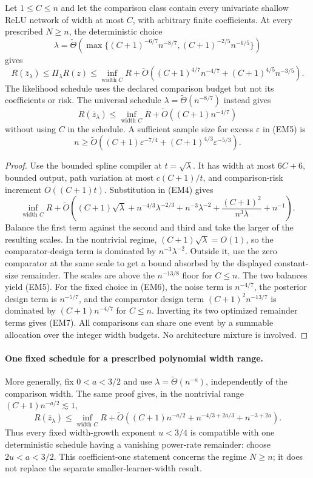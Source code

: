 \begin{corollary}
\label{cor:wide-sharp-width}
Let $1\le C\le n$ and let the comparison class contain every
univariate shallow ReLU network of width at most $C$, with arbitrary
finite coefficients. At every prescribed
$N\ge n$, the deterministic choice
\[
 \lambda=\widetilde\Theta\left(
 \max\{(C+1)^{-6/7}n^{-8/7},
       (C+1)^{-2/5}n^{-6/5}\}\right)
\]
gives
\[
 R(\bar z_\lambda)\le\Pi_\lambda R(z)
 \le\inf_{\text{width }C}R+
 \widetilde O\left(
 (C+1)^{4/7}n^{-4/7}
 +(C+1)^{4/5}n^{-3/5}\right). \tag{EM5}
\]
The likelihood schedule uses the declared comparison budget but not
its coefficients or risk. The universal schedule
$\lambda=\widetilde\Theta(n^{-8/7})$ instead gives
\[
 R(\bar z_\lambda)\le\inf_{\text{width }C}R+
       \widetilde O((C+1)n^{-4/7}) \tag{EM6}
\]
without using $C$ in the schedule.
A sufficient sample size for excess $\varepsilon$ in (EM5) is
\[
 n\ge\widetilde O\left(
 (C+1)\varepsilon^{-7/4}
 +(C+1)^{4/3}\varepsilon^{-5/3}\right). \tag{EM7}
\]
\end{corollary}
\begin{proof}
Use the bounded spline compiler at $t=\sqrt\lambda$.
It has width at most $6C+6$, bounded output, path variation
at most $c(C+1)/t$, and comparison-risk increment
$O((C+1)t)$. Substitution in (EM4) gives
\[
 \inf_{\text{width }C}R+\widetilde O\left(
 (C+1)\sqrt\lambda+n^{-4/3}\lambda^{-2/3}
 +n^{-3}\lambda^{-2}
 +\frac{(C+1)^2}{n^3\lambda}+n^{-1}\right).
\]
Balance the first term against the second and third and take
the larger of the resulting scales. In the nontrivial regime,
$(C+1)\sqrt\lambda=O(1)$, so the comparator-design term is dominated
by $n^{-3}\lambda^{-2}$. Outside it, use the zero comparator at
the same scale to get a bound absorbed by the displayed constant-size
remainder. The scales are above the $n^{-13/8}$ floor for $C\le n$.
The two balances yield (EM5). For the fixed choice in (EM6),
the noise term is $n^{-4/7}$, the posterior design term is
$n^{-5/7}$, and the comparator design term
$(C+1)^2n^{-13/7}$ is dominated by $(C+1)n^{-4/7}$ for $C\le n$.
Inverting its two optimized remainder terms gives (EM7).
All comparisons can share one event by a summable allocation over
the integer width budgets. No architecture mixture is involved.
\end{proof}


\paragraph{One fixed schedule for a prescribed polynomial width range.}
More generally, fix $0<a<3/2$ and use
$\lambda=\widetilde\Theta(n^{-a})$, independently of the comparison
width. The same proof gives, in the nontrivial range
$(C+1)n^{-a/2}\lesssim1$,
\[
 R(\bar z_\lambda)\le\inf_{\text{width }C}R+
 \widetilde O\left((C+1)n^{-a/2}
       +n^{-4/3+2a/3}+n^{-3+2a}\right).
\]
Thus every fixed width-growth exponent $u<3/4$ is compatible with
one deterministic schedule having a vanishing power-rate remainder:
choose $2u<a<3/2$. This coefficient-one statement concerns the
regime $N\ge n$; it does not replace the separate smaller-learner-width
result.

